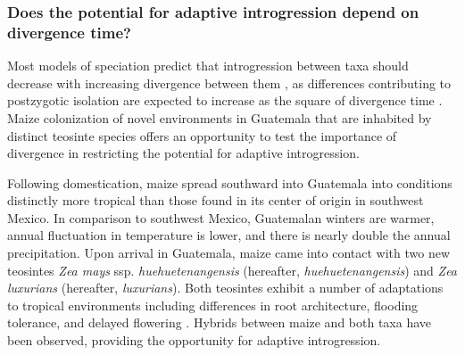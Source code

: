 \subsubsection{Does the potential for adaptive introgression depend on divergence time?}
\label{sss:adaptive_intro}
Most models of speciation predict that introgression between taxa should decrease with increasing divergence between them \citep{harrison2014hybridization}, as differences contributing to postzygotic isolation are expected to increase as the square of divergence time \citep{orr2001evolution}. Maize colonization of novel environments in Guatemala that are inhabited by distinct teosinte species offers an opportunity to test the importance of divergence in restricting the potential for adaptive introgression.

Following domestication, maize spread southward into Guatemala into conditions distinctly more tropical than those found in its center of origin in southwest Mexico.
In comparison to southwest Mexico, Guatemalan winters are warmer, annual fluctuation in temperature is lower, and there is nearly double the annual precipitation.
Upon arrival in Guatemala, maize came into contact with two new teosintes \emph{Zea mays} ssp. \emph{huehuetenangensis} (hereafter, \emph{huehuetenangensis}) and \emph{Zea luxurians} (hereafter, \emph{luxurians}). 
Both teosintes exhibit a number of adaptations to tropical environments including differences in root architecture, flooding tolerance, and delayed flowering \citep{wilkes1967teosinte, mano2006}.
Hybrids between maize and both taxa \citep{wilkes1967teosinte} have been observed, providing the opportunity for adaptive introgression.  

